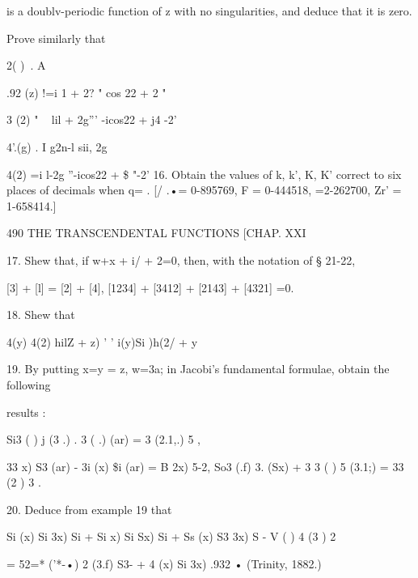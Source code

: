is a doublv-periodic function of z with no singularities, and deduce
that it is zero.

Prove similarly that

 2( )\ . A%

.92 (z) !=i 1 + 2? " cos 22 + 2 "

 3 (2) " ~ lil + 2g''' -icos22 + j4 -2'

 4'.(g) . I g2n-l sii, 2g

  4(2) =i l-2g ''-icos22 + \$ "-2' 16. Obtain the values of k, k', K,
K' correct to six places of decimals when q= . [/ .•= 0-895769, F =
0-444518, =2-262700, Zr' = 1-658414.]

490 THE TRANSCENDENTAL FUNCTIONS [CHAP. XXI

17. Shew that, if w+x + i/ + 2=0, then, with the notation of § 21-22,

[3] + [l] = [2] + [4], [1234] + [3412] + [2143] + [4321] =0.

18. Shew that

 4(y) 4(2) hilZ + z) ' ' i(y)Si )h(2/ + y

19. By putting x=y = z, w=3a; in Jacobi's fundamental formulae, obtain
the following

results :

Si3 ( ) j (3 .) . 3 ( .) (ar) = 3 (2.1,.) 5 ,

 33 x) S3 (ar) - 3i (x) \$i (ar) = B 2x) 5-2, So3 (.f) 3. (Sx) + 3 3 (
) 5 (3.1;) = 33 (2 ) 3 .

20. Deduce from example 19 that

 Si (x) Si 3x) Si + Si x) Si Sx) Si + Ss (x) S3 3x) S - V ( ) 4 (3 ) 2

= 52=* ('*-•) 2 (3.f) S3- + 4 (x) Si 3x) .932 • (Trinity, 1882.)

